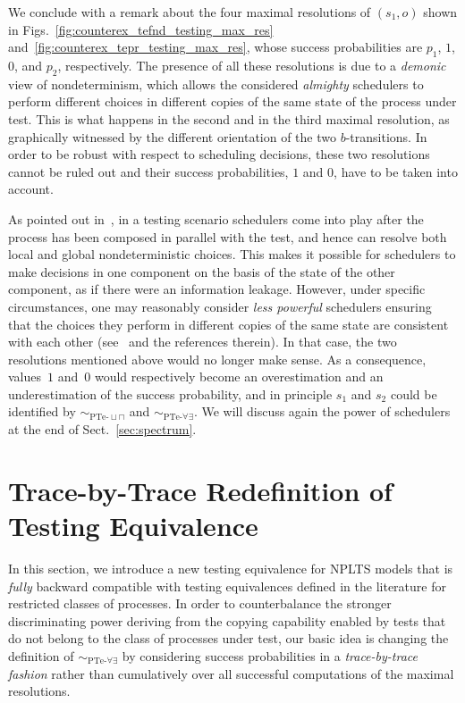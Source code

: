 \documentclass{LMCS}
\newcommand{\sbis}[1]
	{\sim_{#1}}
\begin{document}
We conclude with a remark about the four maximal resolutions of $(s_{1}, o)$ shown in
Figs.~\ref{fig:counterex_tefnd_testing_max_res} and~\ref{fig:counterex_tepr_testing_max_res}, whose success
probabilities are $p_{1}$, $1$, $0$, and $p_{2}$, respectively. The presence of all these resolutions is due
to a \emph{demonic} view of nondeterminism, which allows the considered \emph{almighty} schedulers to
perform different choices in different copies of the same state of the process under test. This is what
happens in the second and in the third maximal resolution, as graphically witnessed by the different
orientation of the two $b$-transitions. In order to be robust with respect to scheduling decisions, these
two resolutions cannot be ruled out and their success probabilities, $1$ and $0$, have to be taken into
account.

As pointed out in~\cite{CLSV06}, in a testing scenario schedulers come into play after the process has been
composed in parallel with the test, and hence can resolve both local and global nondeterministic choices.
This makes it possible for schedulers to make decisions in one component on the basis of the state of the
other component, as if there were an information leakage. However, under specific circumstances, one may
reasonably consider \emph{less powerful} schedulers ensuring that the choices they perform in different
copies of the same state are consistent with each other (see~\cite{GA12} and the references therein). In
that case, the two resolutions mentioned above would no longer make sense. As a consequence, values~$1$
and~$0$ would respectively become an overestimation and an underestimation of the success probability, and
in principle $s_{1}$ and $s_{2}$ could be identified by $\sbis{\textrm{PTe-}\sqcup\sqcap}$ and
$\sbis{\textrm{PTe-}\forall\exists}$. We will discuss again the power of schedulers at the end of
Sect.~\ref{sec:spectrum}.



\section{Trace-by-Trace Redefinition of Testing Equivalence}
\label{sec:tbt_testing_equiv}


In this section, we introduce a new testing equivalence for NPLTS models that is \emph{fully} backward
compatible with testing equivalences defined in the literature for restricted classes of processes. In order
to counterbalance the stronger discriminating power deriving from the copying capability enabled by tests
that do not belong to the class of processes under test, our basic idea is changing the definition of
$\sbis{\textrm{PTe-}\forall\exists}$ by considering success probabilities in a \emph{trace-by-trace fashion}
rather than cumulatively over all successful computations of the maximal resolutions.
\end{document}
